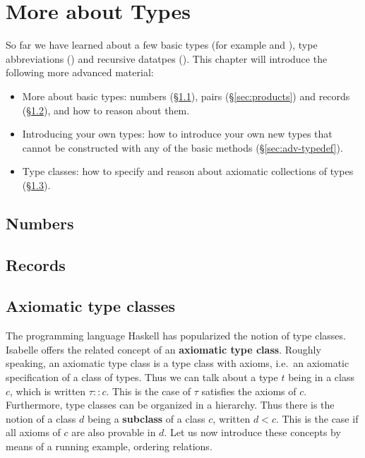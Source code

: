 \chapter{More about Types}
\label{ch:more-types}

So far we have learned about a few basic types (for example  and
), type abbreviations () and recursive datatpes
(). This chapter will introduce the following more
advanced material:
\begin{itemize}
\item More about basic types: numbers ({\S}\ref{sec:numbers}), pairs
  ({\S}\ref{sec:products}) and records ({\S}\ref{sec:records}), and how to
  reason about them.
\item Introducing your own types: how to introduce your own new types that
  cannot be constructed with any of the basic methods
  ({\S}\ref{sec:adv-typedef}).
\item Type classes: how to specify and reason about axiomatic collections of
  types ({\S}\ref{sec:axclass}).
\end{itemize}

\section{Numbers}
\label{sec:numbers}



\section{Records}
\label{sec:records}



\section{Axiomatic type classes}
\label{sec:axclass}


The programming language Haskell has popularized the notion of type classes.
Isabelle offers the related concept of an \textbf{axiomatic type class}.
Roughly speaking, an axiomatic type class is a type class with axioms, i.e.\ 
an axiomatic specification of a class of types. Thus we can talk about a type
$t$ being in a class $c$, which is written $\tau :: c$.  This is the case of
$\tau$ satisfies the axioms of $c$. Furthermore, type classes can be
organized in a hierarchy. Thus there is the notion of a class $d$ being a
\textbf{subclass} of a class $c$, written $d < c$. This is the case if all
axioms of $c$ are also provable in $d$. Let us now introduce these concepts
by means of a running example, ordering relations.

